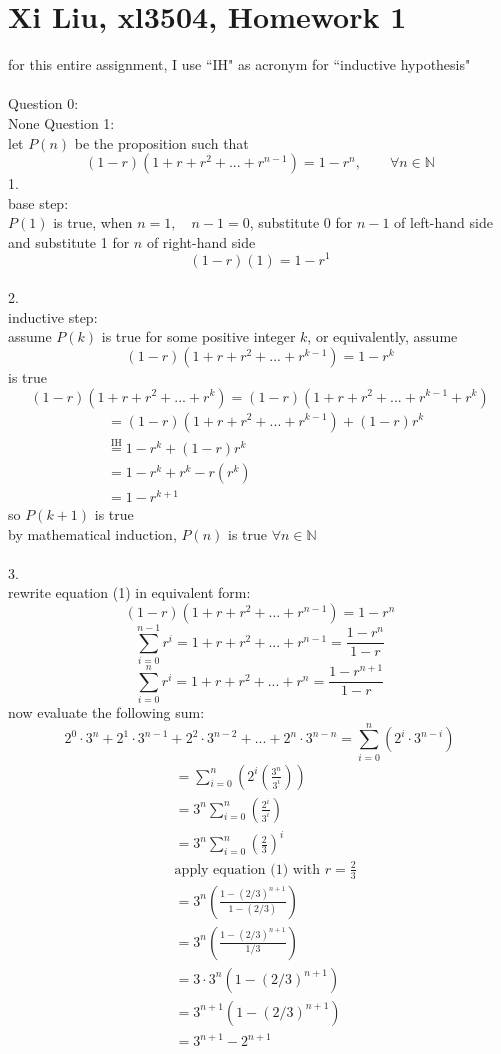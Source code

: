 \documentclass[12pt,border=4pt,multi]{article}%
\begin{document}
\section*{Xi Liu, xl3504, Homework 1}
for this entire assignment, I use ``IH" as acronym for ``inductive hypothesis"\\
\\
Question 0:\\
None
\newpage 
\noindent
Question 1:\\
let $P(n)$ be the proposition such that \[(1 - r)(1 + r + r^2 + ... + r^{n - 1}) = 1 - r^n, \qquad \forall n \in \mathbb{N}\]
1.\\
base step:\\ 
$P(1)$ is true, when $n = 1, \quad n - 1 = 0$, substitute 0 for $n - 1$ of left-hand side and substitute 1 for $n$ of right-hand side
\[(1 - r)(1) = 1 - r^1\]
\\
2.\\
inductive step:\\
assume $P(k)$ is true for some positive integer $k$, or equivalently, assume 
\[(1 - r)(1 + r + r^2 + ... + r^{k - 1}) = 1 - r^k\]
is true
\[(1 - r)(1 + r + r^2 + ... + r^{k}) = (1 - r)(1 + r + r^2 + ... + r^{k - 1} + r^k)\]
\begin{align*}
    &= (1 - r)(1 + r + r^2 + ... + r^{k - 1}) + (1 - r)r^k\\
    &\stackrel{\text{IH}}{=} 1 - r^k + (1 - r)r^k\\
    &= 1 - r^k + r^k - r(r^{k})\\
    &= 1 - r^{k + 1}
\end{align*}
so $P(k + 1)$ is true\\
by mathematical induction, $P(n)$ is true $\forall n \in \mathbb{N}$\\
\\
3.\\
rewrite equation (1) in equivalent form: 
\[(1 - r)(1 + r + r^2 + ... + r^{n - 1}) = 1 - r^n\]
\[\sum_{i = 0}^{n - 1}r^i = 1 + r + r^2 + ... + r^{n - 1} = \frac{1 - r^n}{1 - r}\]
\[\sum_{i = 0}^{n}r^i = 1 + r + r^2 + ... + r^{n} = \frac{1 - r^{n + 1}}{1 - r}\]
now evaluate the following sum:
\[2^0 \cdot 3^n + 2^1 \cdot 3^{n - 1} + 2^2 \cdot 3^{n - 2} + ... + 2^n \cdot 3^{n - n} = \sum_{i = 0}^n \left(2^i \cdot 3^{n - i}\right)\]
\begin{align*}
    &= \sum_{i = 0}^n \left(2^i\left(\frac{3^n}{3^i}\right)\right)\\
    &= 3^n \sum_{i = 0}^n \left(\frac{2^i}{3^i}\right)\\
    &= 3^n \sum_{i = 0}^n \left(\frac{2}{3}\right)^i\\
    &\text{apply equation (1) with } r = \frac{2}{3}\\
    &= 3^n\left(\frac{1 - (2 / 3)^{n + 1}}{1 - (2 / 3)} \right)\\
    &= 3^n\left(\frac{1 - (2 / 3)^{n + 1}}{1 / 3}\right)\\
    &= 3 \cdot 3^n\left(1 - (2 / 3)^{n + 1}\right)\\
    &= 3^{n + 1}\left(1 - (2 / 3)^{n + 1}\right)\\
    &= 3^{n + 1} - 2^{n + 1}\\
\end{align*}
\end{document}
